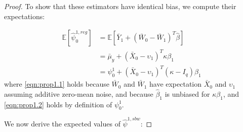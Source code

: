 \begin{proof}
To show that these estimators have identical bias, we compute their expectations:

\begin{align}
\nonumber	\mathbb{E}[\hat{\psi}_0^{1,reg}] &= \mathbb{E}[ \bar{Y}_1 + (\bar{W}_0 - \bar{W}_1)^T \hat{\beta}] \\
	& = \bar{\mu}_y + (\bar{X}_0 - \upsilon_1)^T\kappa\beta_1 \label{eqn:prop1.1}\\
	& = \psi_0^1 + (\bar{X}_0 - \upsilon_1)^T(\kappa - I_q)\beta_1 \label{eqn:prop1.2}
\end{align}
where \eqref{eqn:prop1.1} holds because $\bar{W}_0$ and $\bar{W}_1$ have expectation $\bar{X}_0$ and $\upsilon_1$ assuming additive zero-mean noise, and because $\hat{\beta}_1$ is unbiased for $\kappa\beta_1$, and \eqref{eqn:prop1.2} holds by definition of $\psi_0^1$.

We now derive the expected values of $\hat{\psi}^{1, sbw}$:


\end{proof}
